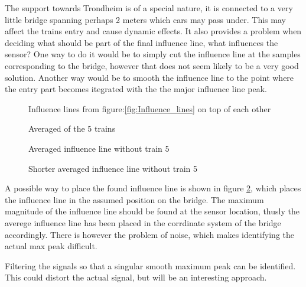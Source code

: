 The support towards Trondheim is of a special nature, it is connected to a very little bridge spanning perhaps 2 meters which cars may pass under. This may affect the trains entry and cause dynamic effects. It also provides a problem when deciding what should be part of the final influence line, what influences the sensor?
One way to do it would be to simply cut the influence line at the samples corresponding to the bridge, however that does not seem likely to be a very good solution. Another way would be to smooth the influence line to the point where the entry part becomes itegrated with the the major influence line peak.

\begin{figure}[H]
	\centering
	
	\caption{Influence lines from figure:\ref{fig:Influence_lines} on top of each other}
	\label{fig:infl_all_trains}
\end{figure}

\begin{figure}[H]
	\centering
	
	\caption{Averaged of the 5 trains}
	\label{fig:infl_vec_averaged_wBridge}
\end{figure}

\begin{figure}[H]
	\centering
	
	\caption{Averaged influence line without train 5}
	\label{fig:infl_vec_averaged_wo_train5}
\end{figure}

\begin{figure}[H]
	\centering
	
	\caption{Shorter averaged influence line without train 5}
	\label{fig:infl_vec_averaged_fft10hz}
\end{figure}

A possible way to place the found influence line is shown in figure \ref{fig:infl_vec_averaged_wBridge}, which places the influence line in the assumed position on the bridge. The maximum magnitude of the influence line should be found at the sensor location, thusly the averege influence line has been placed in the corrdinate system of the bridge accordingly. There is however the problem of noise, which makes identifying the actual max peak difficult.

Filtering the signals so that a singular smooth maximum peak can be identified. This could distort the actual signal, but will be an interesting approach.

